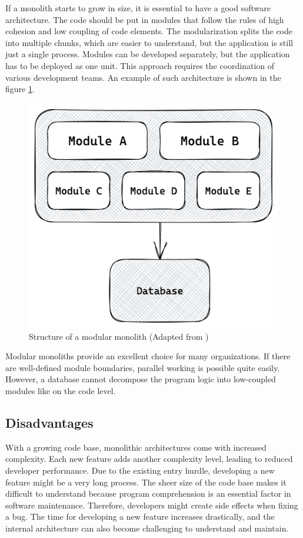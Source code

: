 \noindent If a monolith starts to grow in size, it is essential to have a good software architecture. The code should be put in modules that follow the rules of high cohesion and low coupling of code elements. The modularization splits the code into multiple chunks, which are easier to understand, but the application is still just a single process. Modules can be developed separately, but the application has to be deployed as one unit. This approach requires the coordination of various development teams. \cite[12-13]{book:2018:richardson:background:bff:microservices-patterns} \cite[12-13]{book:2019:newman:background:monolith:monolith-to-microservices} An example of such architecture is shown in the figure \ref{fig:background:monolith:module-monolith-sketch}.

\ifshowImages
\begin{figure}[H]
    \centering
    \includegraphics[width=0.4\linewidth]{images/background/monolith/modular-monolith-sketch.png}
    \caption{Structure of a modular monolith (Adapted from \cite[13]{book:2019:newman:background:monolith:monolith-to-microservices})}\label{fig:background:monolith:module-monolith-sketch}
\end{figure}
\fi

\noindent Modular monoliths provide an excellent choice for many organizations. If there are well-defined module boundaries, parallel working is possible quite easily. However, a database cannot decompose the program logic into low-coupled modules like on the code level. \cite[12-13]{book:2019:newman:background:monolith:monolith-to-microservices}

\subsection{Disadvantages}\label{subsection:background:software-monolith:disadvantages}

With a growing code base, monolithic architectures come with increased complexity. Each new feature adds another complexity level, leading to reduced developer performance. Due to the existing entry hurdle, developing a new feature might be a very long process. The sheer size of the code base makes it difficult to understand because program comprehension is an essential factor in software maintenance. \cite{article:1995:mayrhauser:background:monoliths:program-comprehension-during-software-maintenance-and-evolution} Therefore, developers might create side effects when fixing a bug. The time for developing a new feature increases drastically, and the internal architecture can also become challenging to understand and maintain. \cite[4-6]{book:2018:richardson:background:bff:microservices-patterns}

